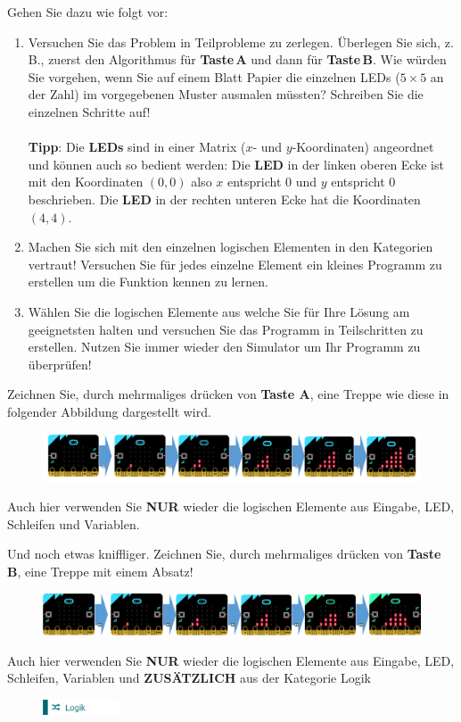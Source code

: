 \documentclass{hmLab}
\begin{document}
Gehen Sie dazu wie folgt vor:
\begin{enumerate}[label=\arabic*.]
	\item Versuchen Sie das Problem in Teilprobleme zu zerlegen. Überlegen Sie sich, z.\,B., zuerst den Algorithmus für \textbf{Taste\,A} und dann für \textbf{Taste\,B}.
	Wie würden Sie vorgehen, wenn Sie auf einem Blatt Papier die einzelnen LEDs ($5 \times 5$ an der Zahl) im vorgegebenen Muster ausmalen müssten? 
	Schreiben Sie die einzelnen Schritte auf!\\\\\textbf{Tipp}: Die \textbf{LEDs} sind in einer Matrix ($x$- und $y$-Koordinaten) angeordnet und können auch so bedient werden: 
	Die \textbf{LED} in der linken oberen Ecke ist mit den Koordinaten $(0,0)$ also $x$ entspricht 0 und $y$ entspricht 0 beschrieben.
	Die \textbf{LED} in der rechten unteren Ecke hat die Koordinaten $(4,4)$.
	\item Machen Sie sich mit den einzelnen logischen Elementen in den Kategorien vertraut! Versuchen Sie für jedes einzelne Element ein kleines Programm zu erstellen um die Funktion kennen zu lernen. 
	\item Wählen Sie die logischen Elemente aus welche Sie für Ihre Lösung am geeignetsten halten und versuchen Sie das Programm in Teilschritten zu erstellen. Nutzen Sie immer wieder den Simulator um Ihr Programm zu überprüfen! 
\end{enumerate}


Zeichnen Sie, durch mehrmaliges drücken von \textbf{Taste A}, eine Treppe wie diese in folgender Abbildung dargestellt wird.
%
\begin{figure}[h!]
	\centering
	\includegraphics[width=1.0\textwidth]{stairs}
\end{figure}
%
Auch hier verwenden Sie \textbf{NUR} wieder die logischen Elemente aus Eingabe, LED, Schleifen und Variablen. 


Und noch etwas kniffliger. Zeichnen Sie, durch mehrmaliges drücken von \textbf{Taste B}, eine Treppe mit einem Absatz! 
%
\begin{figure}[h!]
	\centering
	\includegraphics[width=1.0\textwidth]{stairs-with-floor}
\end{figure}
%
Auch hier verwenden Sie \textbf{NUR} wieder die logischen Elemente aus Eingabe, LED, Schleifen, Variablen und \textbf{ZUSÄTZLICH} aus der Kategorie Logik
	\begin{figure}[h!]
	\centering
	\includegraphics[width=0.2\textwidth]{logic}
\end{figure}
\end{document}
